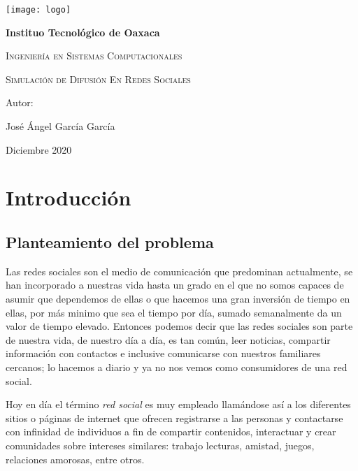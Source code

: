 \documentclass{article}
\begin{document}
		
	\begin{titlepage}
		\centering
		{\texttt{[image: logo]}\par}
		\vspace{1cm}
		{\bfseries\LARGE Instituo Tecnológico de Oaxaca \par}
		\vspace{1cm}
		{\scshape\Large Ingeniería en Sistemas Computacionales  \par}
		\vspace{3cm}
		{\scshape\Huge Simulación de Difusión En Redes Sociales \par}
		\vspace{3cm}
		\vfill
		{\Large Autor: \par}
		{\Large José Ángel García García \par}
		\vfill
		{\Large Diciembre 2020 \par}
		\end{titlepage}
	
\tableofcontents
\newpage
	
\section{Introducción}
 
 \subsection{Planteamiento del problema}
 Las redes sociales son el medio de comunicación que predominan actualmente, se han incorporado a nuestras vida hasta un grado en el que no somos capaces de asumir que dependemos de ellas o que hacemos una gran inversión de tiempo en ellas, por más minimo que sea el tiempo por día, sumado semanalmente da un valor de tiempo elevado. Entonces podemos decir que las redes sociales son parte de nuestra vida, de nuestro día a día, es tan común, leer noticias, compartir información con contactos e inclusive comunicarse con nuestros familiares cercanos; lo hacemos a diario y ya no nos vemos como consumidores de una red social.
  
 Hoy en día el término \textit{red social} es muy empleado llamándose así a los diferentes sitios o páginas de internet que ofrecen registrarse a las personas y contactarse con infinidad de individuos a fin  de compartir contenidos, interactuar y crear comunidades sobre intereses similares: trabajo lecturas, amistad, juegos, relaciones amorosas, entre otros.
\end{document}
